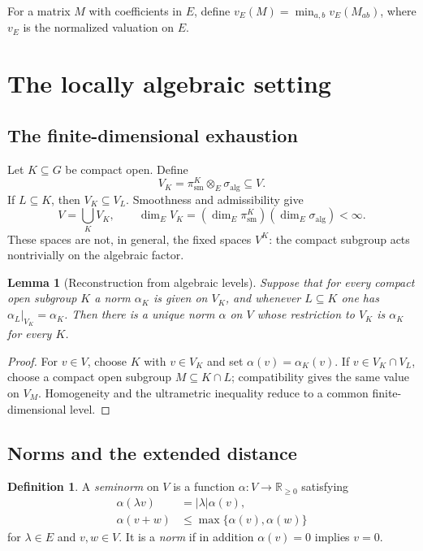 \documentclass[12pt]{article}
\newtheorem{lemma}[theorem]{Lemma}
\theoremstyle{definition}
\newtheorem{definition}[theorem]{Definition}
\theoremstyle{remark}
\newcommand{\R}{\mathbb R}
\begin{document}
For a matrix $M$ with coefficients in $E$, define $v_E(M)=\min_{a,b}v_E(M_{ab})$, where $v_E$ is the normalized valuation on $E$.

\section{The locally algebraic setting}
\label{sec:locally-algebraic}

\subsection{The finite-dimensional exhaustion}

Let $K\subseteq G$ be compact open.  Define
\begin{equation}\label{eq:smooth-union}
 V_K=\pi_{\mathrm{sm}}^K\otimes_E\sigma_{\mathrm{alg}}\subseteq V.
\end{equation}
If $L\subseteq K$, then $V_K\subseteq V_L$.  Smoothness and admissibility
give
\begin{equation}\label{eq:locally-algebraic-union}
 V=\bigcup_KV_K,\qquad
 \dim_EV_K=(\dim_E\pi_{\mathrm{sm}}^K)(\dim_E\sigma_{\mathrm{alg}})<\infty.
\end{equation}
These spaces are not, in general, the fixed spaces $V^K$: the compact
subgroup acts nontrivially on the algebraic factor.

\begin{lemma}[Reconstruction from algebraic levels]\label{lem:reconstruct}
Suppose that for every compact open subgroup $K$ a norm $\alpha_K$ is
given on $V_K$, and whenever $L\subseteq K$ one has
$\alpha_L|_{V_K}=\alpha_K$.  Then there is a unique norm $\alpha$ on $V$
whose restriction to $V_K$ is $\alpha_K$ for every $K$.
\end{lemma}

\begin{proof}
For $v\in V$, choose $K$ with $v\in V_K$ and set
$\alpha(v)=\alpha_K(v)$.  If $v\in V_K\cap V_L$, choose a compact open
subgroup $M\subseteq K\cap L$; compatibility gives the same value on
$V_M$.  Homogeneity and the ultrametric inequality reduce to a common
finite-dimensional level.
\end{proof}

\subsection{Norms and the extended distance}

\begin{definition}
A \emph{seminorm} on $V$ is a function
$\alpha:V\rightarrow\R_{\geq 0}$ satisfying
\begin{align*}
  \alpha(\lambda v)&=|\lambda|\alpha(v),\\
  \alpha(v+w)&\leq\max\{\alpha(v),\alpha(w)\}
\end{align*}
for $\lambda\in E$ and $v,w\in V$.  It is a \emph{norm} if in addition
$\alpha(v)=0$ implies $v=0$.
\end{definition}
\end{document}
